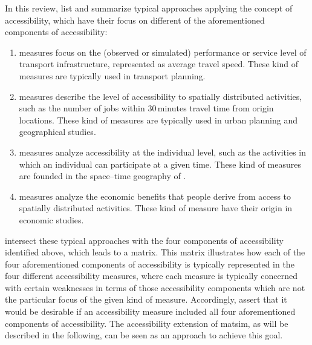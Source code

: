 In this review, \citet{Geurs2004AccessibilityReview} list and summarize typical approaches applying the concept 
of accessibility, which have their focus on different of the aforementioned components of accessibility:

\begin{enumerate}\styleEnumerate
	\item {} measures focus on the (observed or simulated) performance or service level 
	of transport infrastructure, \eg represented as average travel speed. These kind of measures are typically used 
	in transport planning.
	
	\item {} measures describe the level of accessibility to spatially distributed activities, such as 
	the number of jobs within 30\,minutes travel time from origin locations. These kind of measures are typically used 
	in urban planning and geographical studies.
	
	
	\item {} measures analyze accessibility at the individual level, such as the activities in which an 
	individual can participate at a given time. These kind of measures are founded in the space–time geography 
	of \citet{Haegerstrand1970WhatAboutPeople}.
	
	\item {} measures analyze the economic benefits that people derive from access to spatially 
	distributed activities. These kind of measure have their origin in economic studies.
\end{enumerate}

\citet{Geurs2004AccessibilityReview} intersect these typical approaches with the four components of accessibility identified 
above, which leads to a matrix. This matrix illustrates how each of the four aforementioned components of accessibility is 
typically represented in the four different accessibility measures, where each measure is typically concerned with certain weaknesses 
in terms of those accessibility components which are not the particular focus of the given kind of measure. Accordingly, \citet{Geurs2004AccessibilityReview} assert that it would be desirable if an accessibility measure included 
all four aforementioned components of accessibility. The accessibility extension of \gls{matsim}, as will be described in 
the following, can be seen as an approach to achieve this goal.


